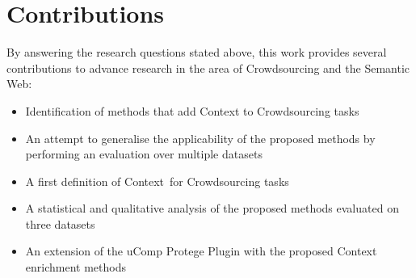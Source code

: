 \section{Contributions}
By answering the research questions stated above, this work provides several contributions to advance research in the area of Crowdsourcing and the Semantic Web:
\begin{itemize}
	\item Identification of methods that add Context to Crowdsourcing tasks
	\item An attempt to generalise the applicability of the proposed methods by performing an evaluation over multiple datasets
	\item A first definition of \guillemotright Context\guillemotleft~for Crowdsourcing tasks 
	\item A statistical and qualitative analysis of the proposed methods evaluated on three datasets
	\item An extension of the uComp Protege Plugin with the proposed Context enrichment methods
\end{itemize}